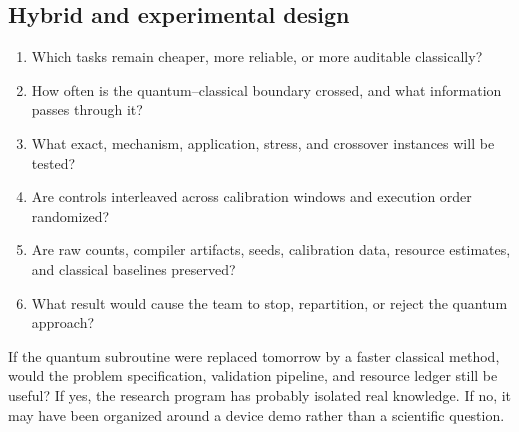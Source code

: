 \subsection{Hybrid and experimental design}

\begin{enumerate}[resume]
  \item Which tasks remain cheaper, more reliable, or more auditable classically?
  \item How often is the quantum--classical boundary crossed, and what information passes through it?
  \item What exact, mechanism, application, stress, and crossover instances will be tested?
  \item Are controls interleaved across calibration windows and execution order randomized?
  \item Are raw counts, compiler artifacts, seeds, calibration data, resource estimates, and classical baselines preserved?
  \item What result would cause the team to stop, repartition, or reject the quantum approach?
\end{enumerate}

\begin{thesisbox}
If the quantum subroutine were replaced tomorrow by a faster classical method, would the problem specification, validation pipeline, and resource ledger still be useful? If yes, the research program has probably isolated real knowledge. If no, it may have been organized around a device demo rather than a scientific question.
\end{thesisbox}
